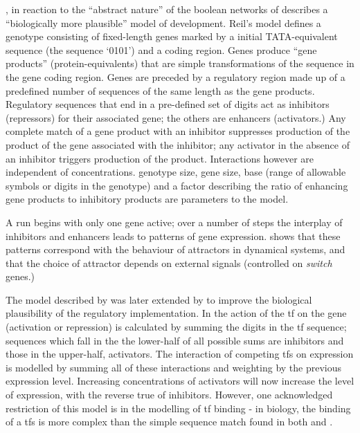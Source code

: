\cite{Reil:1999rp}, in reaction to the ``abstract nature''\parencite[pg. 1]{Reil:1999rp} of the boolean networks of \cite{Kauffman:1969ne} describes a ``biologically more plausible'' \cite[pg. 1]{Reil:1999rp} model of development. Reil's model defines a genotype consisting of fixed-length genes
marked by a initial TATA-equivalent sequence (the sequence `0101') and a coding region. Genes produce ``gene products''
(protein-equivalents) that are simple transformations of the sequence in the gene coding region. Genes are preceded by a
regulatory region made up of a predefined number of sequences of the same length as the gene products. Regulatory
sequences that end in a pre-defined set of digits act as inhibitors (repressors) for their associated gene; the others
are enhancers (activators.) Any complete match of a gene product with an inhibitor suppresses production of the product
of the gene associated with the inhibitor; any activator in the absence of an inhibitor triggers production of the
product. Interactions however are independent of concentrations. genotype size, gene size, base (range of allowable
symbols or digits in the genotype) and a factor describing the ratio of enhancing gene products to inhibitory products are
parameters to the model.

A run begins with only one gene active; over a number of steps the interplay of inhibitors and enhancers leads to
patterns of gene expression. \cite{Reil:1999rp} shows that these patterns correspond with the behaviour of attractors
in dynamical systems, and that the choice of attractor depends on external signals (controlled on \emph{switch} genes.)

The model described by \cite{Reil:1999rp} was later extended by \cite{Rohlf:2009sh} to improve the biological plausibility of the regulatory implementation. In \cite{Rohlf:2009sh} the action of the \gls{tf} on the gene (activation or repression) is calculated by summing the digits in the \gls{tf} sequence; sequences which fall in the the lower-half of all possible sums are inhibitors and those in the upper-half, activators. The interaction of competing \glspl{tf} on expression is modelled by summing all of these interactions and weighting by the previous expression level. Increasing concentrations of activators will now increase the level of expression, with the reverse true of inhibitors. However, one acknowledged restriction of this model is in the modelling of \gls{tf} binding - in biology, the binding of a \glspl{tf} is more complex than the simple sequence match found in both \cite{Reil:1999rp} and \cite{Rohlf:2009sh}.

